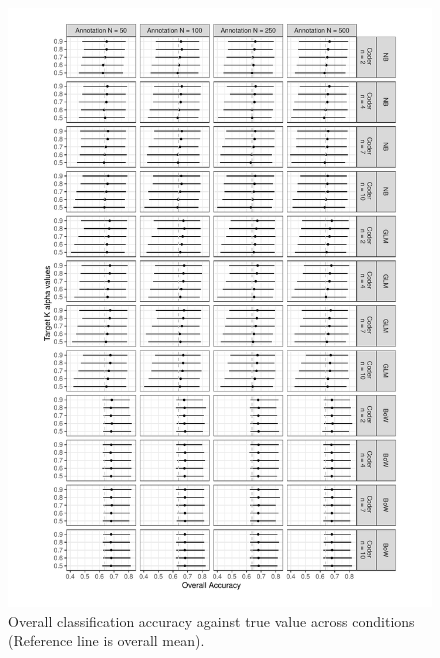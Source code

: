 \documentclass[man, 12pt, a4paper, nolmodern, noextraspace]{apa6}
\begin{document}
\begin{figure}
         \captionsetup[figure]{labelfont=bf,textfont=normalfont,singlelinecheck=on}
         \centering
         \includegraphics[trim={0.2cm 0.2cm 0.2cm 0.2cm}, clip, width=\columnwidth]{Results/overall_accuracy.pdf} 
         \captionsetup{format=hang}
         \caption{Overall classification accuracy against true value across conditions (Reference line is overall mean).} 
         \label{fig:Figure1}
\end{figure}    
\end{document}
